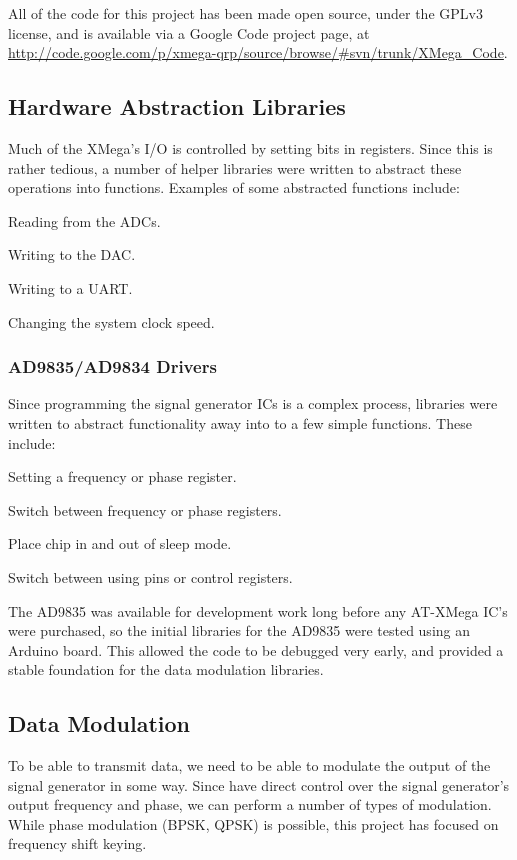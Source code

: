 \documentclass[a4paper,12pt]{article}
\newenvironment{packed_itemize}{
\begin{itemize}
  \setlength{\itemsep}{1pt}
  \setlength{\parskip}{0pt}
  \setlength{\parsep}{0pt}
}{\end{itemize}}
\begin{document}
All of the code for this project has been made open source, under the GPLv3 license, and is available via a Google Code project page, at \url{http://code.google.com/p/xmega-qrp/source/browse/#svn/trunk/XMega_Code}.

\subsection{Hardware Abstraction Libraries}
Much of the XMega's I/O is controlled by setting bits in registers. Since this is rather tedious, a number of helper libraries were written to abstract these operations into functions. Examples of some abstracted functions include:
\begin{packed_itemize}
\item Reading from the ADCs.
\item Writing to the DAC.
\item Writing to a UART.
\item Changing the system clock speed.
\end{packed_itemize}

\subsubsection{AD9835/AD9834 Drivers}
Since programming the signal generator ICs is a complex process, libraries were written to abstract functionality away into to a few simple functions. These include:
\begin{packed_itemize}
\item Setting a frequency or phase register.
\item Switch between frequency or phase registers.
\item Place chip in and out of sleep mode.
\item Switch between using pins or control registers.
\end{packed_itemize}

The AD9835 was available for development work long before any AT-XMega IC's were purchased, so the initial libraries for the AD9835 were tested using an Arduino board. This allowed the code to be debugged very early, and provided a stable foundation for the data modulation libraries.


\subsection{Data Modulation}
To be able to transmit data, we need to be able to modulate the output of the signal generator in some way. Since have direct control over the signal generator's output frequency and phase, we can perform a number of types of modulation. While phase modulation (BPSK, QPSK) is possible, this project has focused on frequency shift keying.
\end{document}
